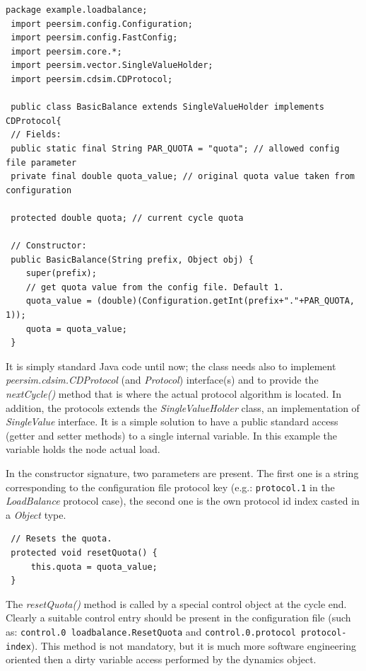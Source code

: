 \documentclass[a4paper,11pt]{article}
\begin{document}
\footnotesize
\begin{verbatim}
package example.loadbalance;
 import peersim.config.Configuration;
 import peersim.config.FastConfig;
 import peersim.core.*;
 import peersim.vector.SingleValueHolder;
 import peersim.cdsim.CDProtocol;

 public class BasicBalance extends SingleValueHolder implements CDProtocol{
 // Fields:
 public static final String PAR_QUOTA = "quota"; // allowed config file parameter
 private final double quota_value; // original quota value taken from configuration
 
 protected double quota; // current cycle quota
 
 // Constructor:
 public BasicBalance(String prefix, Object obj) {
 	super(prefix);
  	// get quota value from the config file. Default 1.
 	quota_value = (double)(Configuration.getInt(prefix+"."+PAR_QUOTA, 1));
 	quota = quota_value;
 }
\end{verbatim}
\normalsize

It is simply standard Java code until now; the class needs also to
implement \emph{peersim.cdsim.CDProtocol} (and \emph{Protocol})
interface(s) and to provide  the \emph{nextCycle()} method 
that is where the actual protocol algorithm is located.
In addition, the protocols extends the \emph{SingleValueHolder} class,
an implementation of \emph{SingleValue} interface. It is a simple
solution to have a public standard access (getter and setter methods)
to a single internal variable. In this example the variable holds the
node actual load.  

In the constructor signature, two parameters are present. The first
one is a string corresponding to the configuration file protocol key
(e.g.: \texttt{protocol.1} in the \emph{LoadBalance} protocol case), the second
one is the own protocol id index casted in a \emph{Object} type.

\footnotesize
\begin{verbatim}
 // Resets the quota. 
 protected void resetQuota() {
     this.quota = quota_value;
 }
\end{verbatim}
\normalsize

The \emph{resetQuota()} method is called by a special control object at
the cycle end. Clearly a suitable control entry should be present
in the configuration file (such as: \texttt{control.0 loadbalance.ResetQuota}
and \texttt{control.0.protocol protocol-index}). This method is not
mandatory, but it is much more software engineering oriented then a
dirty variable access performed by the dynamics object.\\
\end{document}

